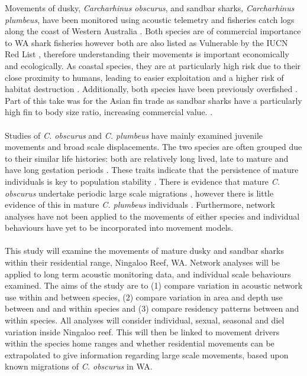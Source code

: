 \documentclass[11pt,a4paper]{article}
\begin{document}
	Movements of dusky, \textit{Carcharhinus obscurus}, and sandbar sharks, \textit{Carcharhinus plumbeus}, have been monitored using acoustic telemetry \citep{Braccini2016} and fisheries catch logs along the coast of Western Australia \citep{Braccini2017a}. Both species are of commercial importance to WA shark fisheries \citep{Braccini2017a} however both are also listed as Vulnerable by the IUCN Red List \citep{Musick2009,Musick2009a}, therefore understanding their movements is important economically and ecologically. As coastal species, they are at particularly high risk due to their close proximity to humans, leading to easier exploitation \citep{Espinoza2015} and a higher risk of habitat destruction \citep{Speed2010}. Additionally, both species have been previously overfished \citep{Benavides2011,Braccini2017a}. Part of this take was for the Asian fin trade as sandbar sharks have a particularly high fin to body size ratio, increasing commercial value. \citep{Braccini2017c}.\\
	\\
	Studies of \textit{C. obscurus} and \textit{C. plumbeus} have mainly examined juvenile movements and broad scale displacements. The two species are often grouped due to their similar life histories: both are relatively long lived, late to mature and have long gestation periods \citep{Cortes2000,Benavides2011,Braccini2017c,Junge2019}. These traits indicate that the persistence of mature individuals is key to population stability \citep{Speed2010}. There is evidence that mature \textit{C. obscurus} undertake periodic large scale migrations \citep{Hussey2009,Braccini2017b}, however there is little evidence of this in mature \textit{C. plumbeus} individuals \citep{Mcauley2005}. Furthermore, network analyses have not been applied to the movements of either species and individual behaviours have yet to be incorporated into movement models.\\
	\\	
	This study will examine the movements of mature dusky and sandbar sharks within their residential range, Ningaloo Reef, WA. Network analyses will be applied to long term acoustic monitoring data, and individual scale behaviours examined. The aims of the study are to (1) compare variation in acoustic network use within and between species, (2) compare variation in area and depth use between and and within species and (3) compare residency patterns between and within species. All analyses will consider individual, sexual, seasonal and diel variation inside Ningaloo reef. This will then be linked to movement drivers within the species home ranges and whether residential movements can be extrapolated to give information regarding large scale movements, based upon known migrations of \textit{C. obscurus} in WA.
	
\end{document}
